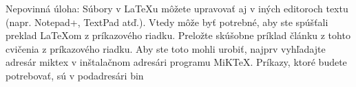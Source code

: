 Nepovinná úloha: Súbory v LaTeXu môžete upravovať aj v iných editoroch textu (napr. Notepad+, TextPad atď.). Vtedy môže byť potrebné, aby ste spúšťali preklad LaTeXom z príkazového riadku. Preložte skúšobne príklad článku z tohto cvičenia z príkazového riadku. Aby ste toto mohli urobiť, najprv vyhľadajte adresár miktex v inštalačnom adresári programu MiKTeX. Príkazy, ktoré budete potrebovať, sú v podadresári bin